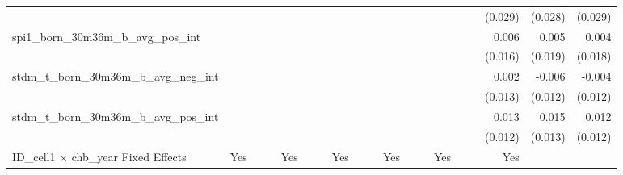 \begin{tabular}{lrrrrrrrrrrrrrrrrrr}
                                            &              &              &              &              &              &              &              &              &               &              &              &               &              &              &               &      (0.029) &      (0.028) &       (0.029) \\ 
spi1\_born\_30m36m\_b\_avg\_pos\_int        &              &              &              &              &              &              &              &              &               &              &              &               &              &              &               &        0.006 &        0.005 &         0.004 \\ 
                                            &              &              &              &              &              &              &              &              &               &              &              &               &              &              &               &      (0.016) &      (0.019) &       (0.018) \\ 
stdm\_t\_born\_30m36m\_b\_avg\_neg\_int     &              &              &              &              &              &              &              &              &               &              &              &               &              &              &               &        0.002 &       -0.006 &        -0.004 \\ 
                                            &              &              &              &              &              &              &              &              &               &              &              &               &              &              &               &      (0.013) &      (0.012) &       (0.012) \\ 
stdm\_t\_born\_30m36m\_b\_avg\_pos\_int     &              &              &              &              &              &              &              &              &               &              &              &               &              &              &               &        0.013 &        0.015 &         0.012 \\ 
                                            &              &              &              &              &              &              &              &              &               &              &              &               &              &              &               &      (0.012) &      (0.013) &       (0.012) \\ 
\midrule
ID\_cell1 $\times$ chb\_year Fixed Effects  &          Yes &              &              &          Yes &              &              &          Yes &              &               &          Yes &              &               &          Yes &              &               &          Yes &              &               \\ 

\end{tabular}
